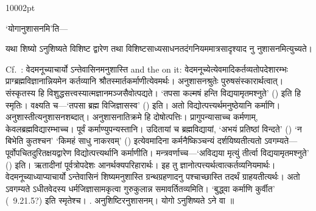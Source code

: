 \begin{messwithp}{1000}{2pt}

{}%
`योगानुशासनमि'ति---%
\fakepar
{}%
\begin{uncertain}यथा शिष्यो ऽनुशिष्यते विशिष्ट%
	द्वारेण \barfu तथा विशिष्टसाध्यसाधनतदंगनियममात्रसादृश्याद%
	नु%
	नुशासनमित्युच्यते।
\end{uncertain}%
%
{Cf.\ : {\dn वेदमनूच्याचार्यो ऽन्ते\-वासि\-नम\-नुशास्ति} and the  on it: {\dn वेदम\-नूच्ये\-त्येवमा\-दि\-कर्तव्यतो\-प\-देशारम्भः प्राग्ब्रह्म\-विज्ञाना\-न्नियमेन कर्त\-व्यानि \barfu श्रौत\-स्मार्त\-कर्माणी\-त्येवम\-र्थः। } {\dn \barfu अनुशासनश्रुतेः पुरुषसंस्कारार्थत्वात्। संस्कृतस्य हि विशुद्धसत्त्वस्यात्मज्ञानमञ्जसैवोत्पद्यते। `तपसा कल्मषं हन्ति विद्ययामृतमश्नुते'} () {\dn इति हि \barfu स्मृतिः। \barfu वक्ष्यति \barfu च---`तप\-सा ब्रह्म विजिज्ञासस्व'} () {\dn इति। \barfu अतो विद्यो\-त्पत्त्यर्थम\-नुष्ठेयानि कर्माणि। \barfu अनुशास्तीत्यनुशासनशब्दात्। अ\-नुशासना\-तिक्रमे हि \barfu दोषो\-त्पत्तिः। प्रागु\-पन्यासा\-च्च कर्मणाम्, केवल\-ब्रह्म\-विद्या\-रम्भाच्च। पूर्वं कर्माण्यु\-पन्यस्तानि। उदितायां च ब्रह्मविद्यायां, `अभयं प्रतिष्ठां विन्दते'} () {\dn `न बिभेति कुतश्चन' `किमहं साधु नाकरवम्'} () {\dn इत्येवमादिना कर्मनैष्किञ्चन्यं दर्शयिष्यतीत्यतो ऽवगम्यते---पूर्वोपचितदुरितक्षयद्वारेण विद्योत्पत्त्यर्थानि कर्माणीति। मन्त्र\-वर्णाच्च---`अविद्यया मृत्युं तीर्त्वा विद्ययामृतमश्नुते'} () {\dn इति। ऋतादीनां \barfu पूर्वत्रोपदेशः \barfu आन\-र्थक्य\-परिहारा\-र्थः। इह तु \barfu ज्ञानो\-त्पत्त्यर्थ\-त्वा\-त्कर्तव्य\-नियमा\-र्थः। वेद\-मनूच्या\-ध्याप्या\-चार्यो ऽन्तेवासिनं शिष्यम\-नुशास्ति ग्रन्थ\-ग्रहणादनु पश्चाच्छास्ति तदर्थं \barfu ग्राहयती\-त्यर्थः। अतो ऽवगम्यते ऽधीत\-वेदस्य ध\-र्मजिज्ञासाम\-कृत्वा गुरु\-कुलान्न समा\-वर्तितव्यमिति। `बुद्ध्वा कर्माणि कुर्वीत'} (\Apastambhadharmasutra\ 9.21.5?) {\dn इति स्मृतेश्च।} \citep[420]{upa1}.%
} %
\barfu अ\-नुशिष्टिरनुशासनम्। \barfu यो\-गो ऽनुशिष्यते ऽने \barfu वा ॥%

\end{messwithp}

